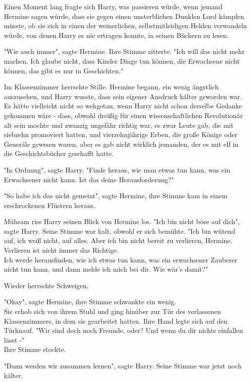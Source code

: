 {Einen Moment lang fragte sich Harry, was passieren würde, wenn jemand Hermine sagen würde, dass sie gegen einen unsterblichen Dunklen Lord kämpfen müsste, ob sie sich in einen der weinerlichen, selbstmitleidigen Helden verwandeln würde, von denen Harry es nie ertragen konnte, in seinen Büchern zu lesen.

"Wie auch immer", sagte Hermine. Ihre Stimme zitterte. "Ich will das nicht mehr machen. Ich glaube nicht, dass Kinder Dinge tun können, die Erwachsene nicht können, das gibt es nur in Geschichten."

Im Klassenzimmer herrschte Stille. Hermine begann, ein wenig ängstlich auszusehen, und Harry wusste, dass sein eigener Ausdruck kälter geworden war. Es hätte vielleicht nicht so wehgetan, wenn Harry nicht schon derselbe Gedanke gekommen wäre - dass, obwohl dreißig für einen wissenschaftlichen Revolutionär alt sein mochte und zwanzig ungefähr richtig war, es zwar Leute gab, die mit siebzehn promoviert hatten, und vierzehnjährige Erben, die große Könige oder Generäle gewesen waren, aber es gab nicht wirklich jemanden, der es mit elf in die Geschichtsbücher geschafft hatte.

"In Ordnung", sagte Harry. "Finde heraus, wie man etwas tun kann, was ein Erwachsener nicht kann. Ist das deine Herausforderung?"

"So habe ich das nicht gemeint", sagte Hermine, ihre Stimme kam in einem erschrockenen Flüstern heraus.

Mühsam riss Harry seinen Blick von Hermine los. "Ich bin nicht böse auf dich", sagte Harry. Seine Stimme war kalt, obwohl er sich bemühte. "Ich bin wütend auf, ich weiß nicht, auf alles. Aber ich bin nicht bereit zu verlieren, Hermine. Verlieren ist nicht immer das Richtige.\\ Ich werde herausfinden, wie ich etwas tun kann, was ein erwachsener Zauberer nicht tun kann, und dann melde ich mich bei dir. Wie wär's damit?"

Wieder herrschte Schweigen.

"Okay", sagte Hermine, ihre Stimme schwankte ein wenig.\\ Sie erhob sich von ihrem Stuhl und ging hinüber zur Tür des verlassenen Klassenzimmers, in dem sie gearbeitet hatten. Ihre Hand legte sich auf den Türknauf. "Wir sind doch noch Freunde, oder? Und wenn du dir nichts einfallen lässt -"\\ Ihre Stimme stockte.

"Dann werden wir zusammen lernen", sagte Harry. Seine Stimme war jetzt noch kälter.

}
